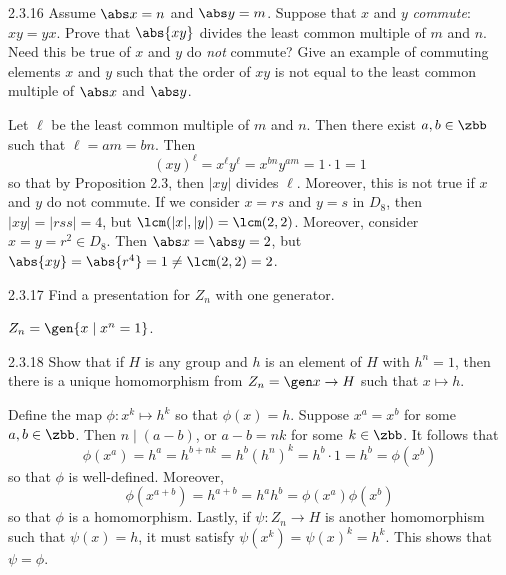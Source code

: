 \begin{exercise}{2.3.16}
    Assume $\abs x = n$ and $\abs y = m$.
	Suppose that $x$ and $y$ \emph{commute}: $xy = yx$.
	Prove that $\abs{xy}$ divides the least common multiple of $m$ and $n$.
	Need this be true of $x$ and $y$ do \emph{not} commute?
	Give an example of commuting elements $x$ and $y$ such that the order of $xy$ is not equal to the least common multiple of $\abs x$ and $\abs y$.
\end{exercise}

\begin{sol}
    Let $\ell$ be the least common multiple of $m$ and $n$.
	Then there exist $a, b \in \zbb$ such that $\ell = am = bn$.
	Then
    \[
    	(xy)^\ell = x^\ell y^\ell = x^{bn}y^{am} = 1 \cdot 1 = 1
    \]
    so that by Proposition 2.3, then $|xy|$ divides $\ell$.
	Moreover, this is not true if $x$ and $y$ do not commute.
	If we consider $x = rs$ and $y = s$ in $D_8$, then $|xy| = |rss| = 4$, but $\lcm(|x|, |y|) = \lcm(2, 2)$.
	Moreover, consider $x = y = r^2 \in D_8$.
	Then $\abs x = \abs y = 2$, but $\abs{xy} = \abs{r^4} = 1 \neq \lcm(2, 2) = 2$.
\end{sol}

\begin{exercise}{2.3.17}
    Find a presentation for $Z_n$ with one generator.
\end{exercise}

\begin{sol}
    $Z_n = \gen{x \mid x^n = 1}$.
\end{sol}

\begin{exercise}{2.3.18}
    Show that if $H$ is any group and $h$ is an element of $H$ with $h^n = 1$, then there is a unique homomorphism from $Z_n = \gen x \to H$ such that $x \mapsto h$.
\end{exercise}

\begin{sol}
    Define the map $\phi : x^k \mapsto h^k$ so that $\phi(x) = h$.
	Suppose $x^a = x^b$ for some $a, b \in \zbb$.
	Then $n \mid (a - b)$, or $a - b = nk$ for some $k \in \zbb$.
	It follows that
    \[
    	\phi(x^a) = h^a = h^{b + nk} = h^b (h^n)^k = h^b \cdot 1 = h^b = \phi(x^b)
    \]
    so that $\phi$ is well-defined.
	Moreover,
    \[
    	\phi(x^{a + b}) = h^{a + b} = h^a h^b = \phi(x^a) \phi(x^b)
    \]
    so that $\phi$ is a homomorphism.
	Lastly, if $\psi : Z_n \to H$ is another homomorphism such that $\psi(x) = h$, it must satisfy $\psi(x^k) = \psi(x)^k = h^k$.
	This shows that $\psi = \phi$.
\end{sol}

